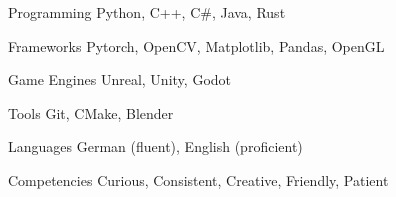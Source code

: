 

\begin{cvskills}


  \cvskill
    {Programming} %
    {Python, C++, C\#, Java, Rust} %

  \cvskill
    {Frameworks} %
    {Pytorch, OpenCV, Matplotlib, Pandas, OpenGL} %

  \cvskill
    {Game Engines} %
    {Unreal, Unity, Godot} %

  \cvskill
    {Tools} %
    {Git, CMake, Blender} %

  \cvskill
    {Languages} %
    {German (fluent), English (proficient)} %

  \cvskill
    {Competencies} %
    {Curious, Consistent, Creative, Friendly, Patient} %
\end{cvskills}
